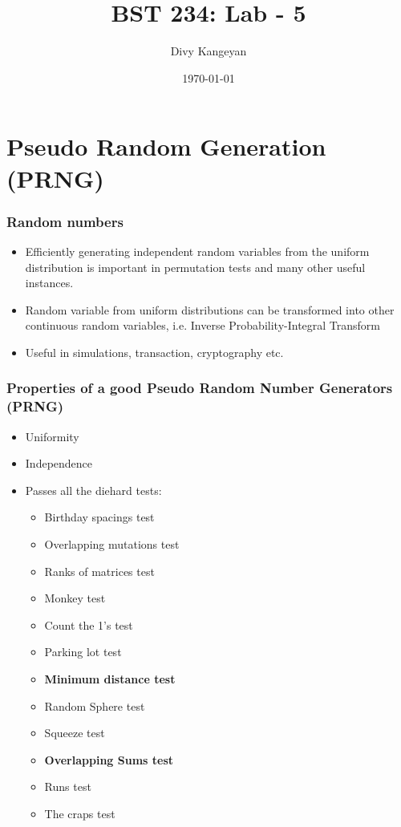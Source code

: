\documentclass{beamer}
\title[BST 234]{BST 234: Lab - 5}
\author[Divy Kangeyan]{Divy Kangeyan}
\date{\today}
\begin{document}
	
	\begin{frame}
		\titlepage
	\end{frame}
	
	
\section{Pseudo Random Generation (PRNG)}




\begin{frame}
\frametitle{Random numbers}

\begin{itemize}
\item Efficiently generating independent random variables from the uniform distribution is important in permutation tests and many other useful instances.
\item Random variable from uniform distributions can be transformed into other continuous random variables, i.e. Inverse Probability-Integral Transform
\item Useful in simulations, transaction, cryptography etc. 
\end{itemize}

\end{frame}






\begin{frame}
\frametitle{Properties of a good Pseudo Random Number Generators (PRNG)}

\begin{itemize}
\item Uniformity
\item Independence
\item Passes all the diehard tests:
\begin{itemize}
\item Birthday spacings test
\item Overlapping mutations test
\item Ranks of matrices test
\item Monkey test
\item Count the 1's test
\item Parking lot test
\item \textbf{Minimum distance test}
\item Random Sphere test
\item Squeeze test
\item \textbf{Overlapping Sums test}
\item Runs test
\item The craps test
\end{itemize}

\end{itemize}

\end{frame}
\end{document}
